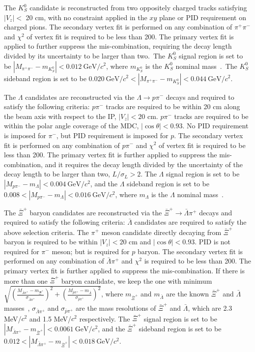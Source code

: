 \documentclass[amsmath,amssymb,twocolumn,prd,floatfix,showpacs,nofootinbib]{revtex4-1}
\begin{document}
The $ K^0_S$ candidate is reconstructed from two oppositely charged tracks satisfying $|V_{z}|<$ 20 cm, with no constraint applied in the $xy$ plane or PID requirement on charged pions. The secondary vertex fit is performed on any combination of $\pi^+ \pi^-$ and $\chi^2$ of vertex fit is required to be less than 200. The primary vertex fit is applied to further suppress the mis-combination, requiring the decay length divided by its uncertainty to be larger than two.~The $K^{0}_{S}$ signal region is set to be $|M_{\pi^+ \pi^-}-m_{K^{0}_{S}}|<0.012~\mathrm{GeV/}$${c}^2$, where $m_{K^{0}_{S}}$ is the $K^0_S$ nominal mass~\cite{ref::pdg2024}.~The $K^{0}_{S}$ sideband region is set to be $0.020~\mathrm{GeV/}$${c}^2<|M_{\pi^+ \pi^-}-m_{K^{0}_{S}}|<0.044~\mathrm{GeV/}$${c}^2$.


The $\Lambda$ candidates are reconstructed via the $\Lambda \to p \pi^-$ decays and required to satisfy the following criteria:
$ p \pi^-$ tracks are required to be within 20 cm along the beam axis with respect to the IP, $|V_z|<20$ cm.
$ p \pi^-$ tracks are required to be within the polar angle coverage of the MDC, $|\cos\theta|<0.93$.
No PID requirement is imposed for $\pi^-$, but PID requirement is imposed for $p$.
The secondary vertex fit is performed on any combination of $p \pi^-$ and $\chi^2$ of vertex fit is required to be less than 200.
The primary vertex fit is further applied to suppress the mis-combination, and it requires the decay length divided by the uncertainty of the decay length to be larger than two, $L/\sigma_L>2$.
The $\Lambda$ signal region is set to be $|M_{p\pi^-}-m_{\Lambda}|<0.004~\mathrm{GeV}/c^2$, and the $\Lambda$ sideband region is set to be $0.008<|M_{p \pi^-}-m_{\Lambda}|<0.016~\mathrm{GeV}/c^2$, where $m_{\Lambda}$ is the $\Lambda$ nominal mass~\cite{ref::pdg2024}.

The $\bar \Xi^+$ baryon candidates are reconstructed via the $\bar \Xi^+\to \bar \Lambda \pi^+$ decays and required to satisfy the following criteria:
$\bar \Lambda$ candidates are required to satisfy the above selection criteria.
The $\pi^+$ meson candidate directly decaying from $\bar \Xi^+$  baryon is required to be within $|V_z|<20$ cm and $|\cos\theta|<0.93$.
PID is not required for $\pi^-$ meson; but is required for $p$ baryon.
The secondary vertex fit is performed on any combination of $\bar \Lambda \pi^+$ and $\chi^2$ is required to be less than 200.
The primary vertex fit is further applied to suppress the mis-combination. If there is more than one $\bar \Xi^+$  baryon candidate, we keep the one with minimum $\sqrt{(\frac{M_{\bar \Lambda \pi^+}-m_{\bar{\Xi}^+}}{\sigma_{\bar{\Lambda}\pi^+}})^2+(\frac{M_{\bar{p}\pi^+}-m_{\bar{\Lambda}}}{\sigma_{\bar{p}\pi^+}})^2}$, where $m_{\bar{\Xi}^+}$ and $m_{\bar{\Lambda}}$ are the known $\bar \Xi^+$ and $\bar{\Lambda}$ masses~\cite{ref::pdg2024}, $\sigma_{\bar{\Lambda}\pi^+}$ and $\sigma_{\bar{p}\pi^+}$ are the mass resolutions of $\bar\Xi^+$ and $\bar{\Lambda}$, which are 2.3 MeV/$c^2$ and 1.5 MeV/$c^2$ respectively.
The $\bar \Xi^+$ signal region is set to be $|M_{\bar \Lambda \pi^+}-m_{\bar{\Xi}^+}|<0.0061~\mathrm{GeV}/c^2$, and the $\bar \Xi^+$ sideband region is set to be $0.012<|M_{\bar \Lambda \pi^+}-m_{\bar{\Xi}^+}|<0.018~\mathrm{GeV}/c^2$.
\end{document}
